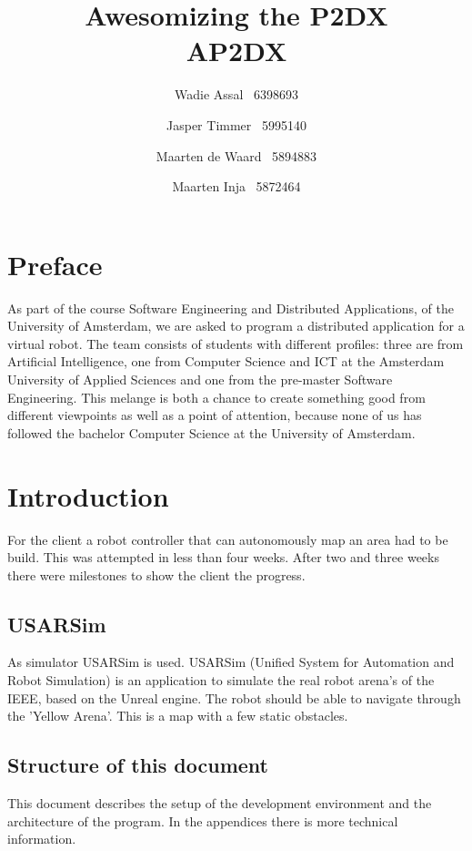 \documentclass[titlepage, a4paper,10pt]{article}
\title{Awesomizing the P2DX\\\small AP2DX}
\author{Wadie Assal \ 6398693 \and Jasper Timmer \ 5995140 \and Maarten de Waard \ 5894883 \and  Maarten Inja \ 5872464}
\begin{document}
\maketitle

\tableofcontents
\newpage


\section{Preface}
As part of the course Software Engineering and Distributed Applications, of the University of Amsterdam, we are asked to program a distributed application for a virtual robot. The team consists of students with different profiles: three are from Artificial Intelligence, one from Computer Science and ICT at the Amsterdam University of Applied Sciences and one from the pre-master Software Engineering. This melange is both a chance to create something good from different viewpoints as well as a point of attention, because none of us has followed the bachelor Computer Science at the University of Amsterdam. 

\newpage

\section{Introduction}
For the client a robot controller that can autonomously map an area had to be build. This was attempted in less than four weeks. After two and three weeks there were milestones to show the client the progress.

\subsection{USARSim}
As simulator USARSim is used. USARSim (Unified System for Automation and Robot Simulation) is an application to simulate the real robot arena's of the IEEE, based on the Unreal engine. The robot should be able to navigate through the 'Yellow Arena'. This is a map with a few static obstacles.

\subsection{Structure of this document}
This document describes the setup of the development environment and the architecture of the program. In the appendices there is more technical information.
\end{document}
